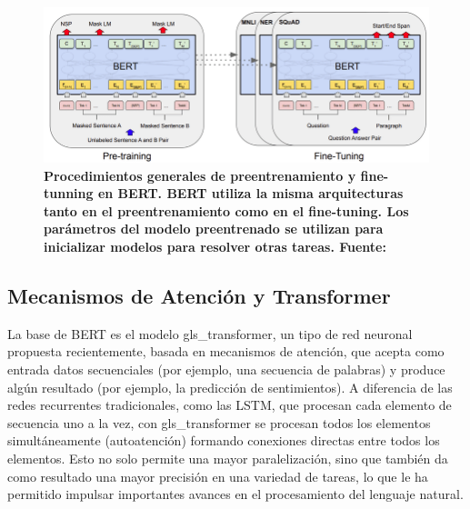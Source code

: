 \begin{figure}[ht!]
    \centering
    \includegraphics[scale=0.5]{figuras/intro-bert-transfer.png}
    \caption[BERT - Transfer Learning]{\textbf{Procedimientos generales de preentrenamiento y fine-tunning en BERT. BERT utiliza la misma arquitecturas tanto en el preentrenamiento como en el fine-tuning. Los parámetros del modelo preentrenado se utilizan para inicializar modelos para resolver otras tareas. Fuente: \citep{https://doi.org/10.48550/arxiv.1810.04805}}}
    \label{fig-intro-bert-transfer}
\end{figure}

\subsection{Mecanismos de Atención y Transformer}
\label{subsection-atencion-transformer}

La base de BERT es el modelo \Gls{gls_transformer}, un tipo de red neuronal propuesta recientemente, basada en mecanismos de atención, que acepta como entrada datos secuenciales (por ejemplo, una secuencia de palabras) y produce algún resultado (por ejemplo, la predicción de sentimientos). A diferencia de las redes recurrentes tradicionales, como las LSTM, que procesan cada elemento de secuencia uno a la vez, con \Gls{gls_transformer} se procesan todos los elementos simultáneamente (autoatención) formando conexiones directas entre todos los elementos. Esto no solo permite una mayor paralelización, sino que también da como resultado una mayor precisión en una variedad de tareas, lo que le ha permitido impulsar importantes avances en el procesamiento del lenguaje natural.

